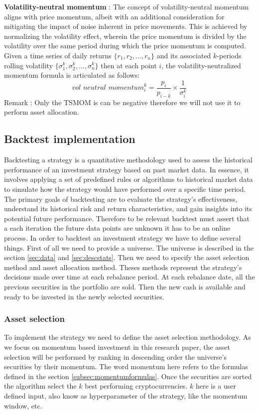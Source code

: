 \documentclass{article}
\begin{document}
\textbf{Volatility-neutral momentum} : The concept of volatility-neutral momentum aligns with price momentum, albeit with an additional consideration for mitigating the impact of noise inherent in price movements. This is achieved by normalizing the volatility effect, wherein the price momentum is divided by the volatility over the same period during which the price momentum is computed. Given a time series of daily returns $\{r_1, r_2, ..., r_n\}$ and its associated $k$-periods rolling volatility $\{\sigma_1^k, \sigma_2^k, ..., \sigma_n^k\}$ then at each point $i$, the volatility-neutralized momentum formula is articulated as follows: $$\textit{vol neutral momentum}^{k}_i = \frac{p_i}{p_{i-k}}\times\frac{1}{\sigma_i^k}$$
Remark : Only the TSMOM is can be negative therefore we will not use it to perform asset allocation.
\subsection{Backtest implementation}\label{subsec:backtestimplem}
Backtesting a strategy is a quantitative methodology used to assess the historical performance of an investment strategy based on past market data. In essence, it involves applying a set of predefined rules or algorithms to historical market data to simulate how the strategy would have performed over a specific time period. The primary goals of backtesting are to evaluate the strategy's effectiveness, understand its historical risk and return characteristics, and gain insights into its potential future performance. Therefore to be relevant backtest must assert that a each iteration the future data points are unknown it has to be an online process.
\newline
In order to backtest an investment strategy we have to define several things. First of all we need to provide a universe. The universe is described in the section \ref{sec:data} and \ref{sec:descstats}. Then we need to specify the asset selection method and asset allocation method. Theses methods represent the strategy's decisions made over time at each rebalance period. At each rebalance date, all the previous securities in the portfolio are sold. Then the new cash is available and ready to be invested in the newly selected securities.

\subsubsection{Asset selection}
To implement the strategy we need to define the asset selection methodology. As we focus on momentum based investment in this research paper, the asset selection will be performed by ranking in descending order the universe's securities by their momentum. The word momentum here refers to the formulas defined in the section \ref{subsec:momentumformulas}. Once the securities are sorted the algorithm select the $k$ best performing cryptocurrencies. $k$ here is a user defined input, also know as hyperparameter of the strategy, like the momentum window, etc.
\end{document}

